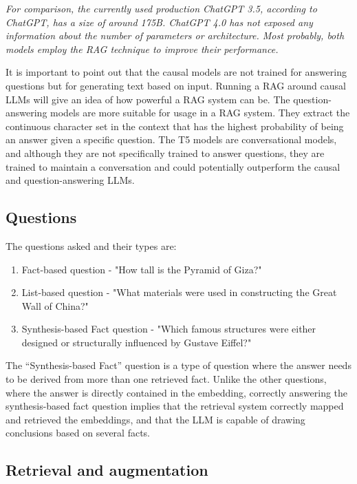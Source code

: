 \documentclass{wseas}
\begin{document}
\emph{For comparison, the currently used production ChatGPT 3.5,
according to ChatGPT, has a size of around 175B. ChatGPT 4.0 has not
exposed any information about the number of parameters or architecture.
Most probably, both models employ the RAG technique to improve their
performance.}

It is important to point out that the causal models are not trained for
answering questions but for generating text based on input. Running a
RAG around causal LLMs will give an idea of how powerful a RAG system
can be. The question-answering models are more suitable for usage in a
RAG system. They extract the continuous character set in the context
that has the highest probability of being an answer given a specific
question. The T5 models are conversational models, and although they are
not specifically trained to answer questions, they are trained to
maintain a conversation and could potentially outperform the causal and
question-answering LLMs.

\subsection{Questions}

The questions asked and their types are:

\begin{enumerate}
\def\labelenumi{\arabic{enumi}.}
\item
  Fact-based question - "How tall is the Pyramid of Giza?"
\item
  List-based question - "What materials were used in constructing the
  Great Wall of China?"
\item
  Synthesis-based Fact question - "Which famous structures were either
  designed or structurally influenced by Gustave Eiffel?"
\end{enumerate}

The ``Synthesis-based Fact'' question is a type of question where the
answer needs to be derived from more than one retrieved fact. Unlike the
other questions, where the answer is directly contained in the
embedding, correctly answering the synthesis-based fact question implies
that the retrieval system correctly mapped and retrieved the embeddings,
and that the LLM is capable of drawing conclusions based on several
facts.


\subsection{Retrieval and
augmentation}
\end{document}
